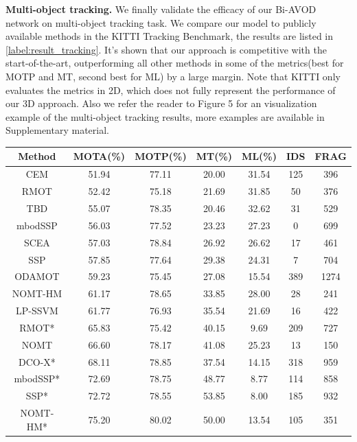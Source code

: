 \documentclass{bmvc2k}
\begin{document}
\textbf{Multi-object tracking.} We finally validate the efficacy of our Bi-AVOD network on multi-object tracking task. We compare our model to publicly available methods in the KITTI Tracking Benchmark, the results are listed in \tablename \, \ref{label:result_tracking}. It's shown that our approach is competitive with the start-of-the-art, outperforming all other methods in some of the metrics(best for MOTP and MT, second best for ML) by a large margin. Note that KITTI only evaluates the metrics in 2D, which does not fully represent the performance of our 3D approach. Also we refer the reader to Figure 5 for an visualization example of the multi-object tracking results, more examples are available in Supplementary material.
\begin{table}[]\centering
	\footnotesize
	\begin{tabular}{ccccccc}
		\toprule[1.5pt]
		Method        & MOTA(\%) & MOTP(\%) & MT(\%) & ML(\%) & IDS & FRAG \\ \midrule
		CEM           & 51.94    & 77.11    & 20.00  & 31.54  & 125 & 396  \\
		RMOT          & 52.42    & 75.18    & 21.69  & 31.85  & 50  & 376  \\
		TBD           & 55.07    & 78.35    & 20.46  & 32.62  & 31  & 529  \\
		mbodSSP       & 56.03    & 77.52    & 23.23  & 27.23  & 0   & 699  \\
		SCEA          & 57.03    & 78.84    & 26.92  & 26.62  & 17  & 461  \\
		SSP           & 57.85    & 77.64    & 29.38  & 24.31  & 7   & 704  \\
		ODAMOT        & 59.23    & 75.45    & 27.08  & 15.54  & 389 & 1274 \\
		NOMT-HM       & 61.17    & 78.65    & 33.85  & 28.00  & 28  & 241  \\
		LP-SSVM       & 61.77    & 76.93    & 35.54  & 21.69  & 16  & 422  \\
		RMOT*         & 65.83    & 75.42    & 40.15  & 9.69   & 209 & 727  \\
		NOMT          & 66.60    & 78.17    & 41.08  & 25.23  & 13  & 150  \\
		DCO-X*        & 68.11    & 78.85    & 37.54  & 14.15  & 318 & 959  \\
		mbodSSP*      & 72.69    & 78.75    & 48.77  & 8.77   & 114 & 858  \\
		SSP*          & 72.72    & 78.55    & 53.85  & 8.00   & 185 & 932  \\
		NOMT-HM*      & 75.20    & 80.02    & 50.00  & 13.54  & 105 & 351  \\

\end{tabular}
\end{table}
\end{document}
